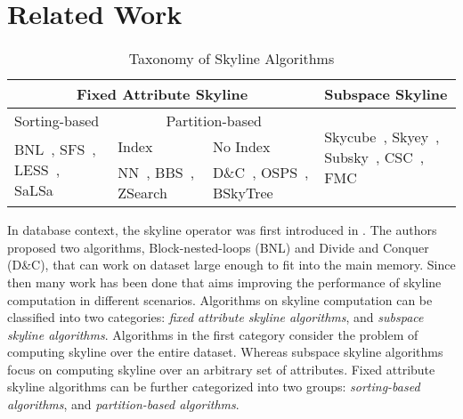 \section{Related Work}\label{sec:relWork}
\vspace{1mm}

\begin{table}[!tb]
\centering
\caption{Taxonomy of Skyline Algorithms}\label{tab:runningExampleSubspaceSkyline}
\begin{tabular}{p{1.4cm}|p{1.6cm}|p{1.8cm}|p{1.8cm}}
    
    \hline 
    \multicolumn{3}{c|}{Fixed Attribute Skyline} & Subspace Skyline\\
    \hline
    
    Sorting-based & \multicolumn{2}{c|}{Partition-based} & \multirow{3}{1.8cm}{Skycube~\cite{yuan2005efficient}, Skyey~\cite{pei2005catching}, Subsky~\cite{tao2006subsky}, CSC~\cite{xia2012online}, FMC~\cite{maabout2016skycube}} \\ \cline{1-3}
    
    \multirow{2}{1.4cm}{BNL~\cite{borzsony2001skyline}, SFS~\cite{chomicki2003skyline}, LESS~\cite{godfrey2005maximal}, SaLSa~\cite{bartolini2008efficient}} & Index & No Index & \\ \cline{2-3}
    
     & NN~\cite{kossmann2002shooting}, BBS~\cite{papadias2003optimal}, ZSearch~\cite{lee2007approaching} & D\&C~\cite{borzsony2001skyline}, OSPS~\cite{zhang2009scalable}, BSkyTree~\cite{lee2014scalable} & \\
    \hline
\end{tabular}
\end{table}

In database context, the skyline operator was first introduced in \cite{borzsony2001skyline}. The authors proposed two algorithms, Block-nested-loops (BNL) and Divide and Conquer (D\&C), that can work on dataset large enough to fit into the main memory. Since then many work has been done that aims improving the performance of  skyline computation in different scenarios. Algorithms on skyline computation can be classified into two categories: \textit{fixed attribute skyline algorithms}, and \textit{subspace skyline algorithms}. Algorithms in the first category consider the problem of computing skyline over the entire dataset. Whereas subspace skyline algorithms focus on computing skyline over an arbitrary set of attributes. Fixed attribute skyline algorithms can be further categorized into two groups: \textit{sorting-based algorithms}, and \textit{partition-based algorithms}.


